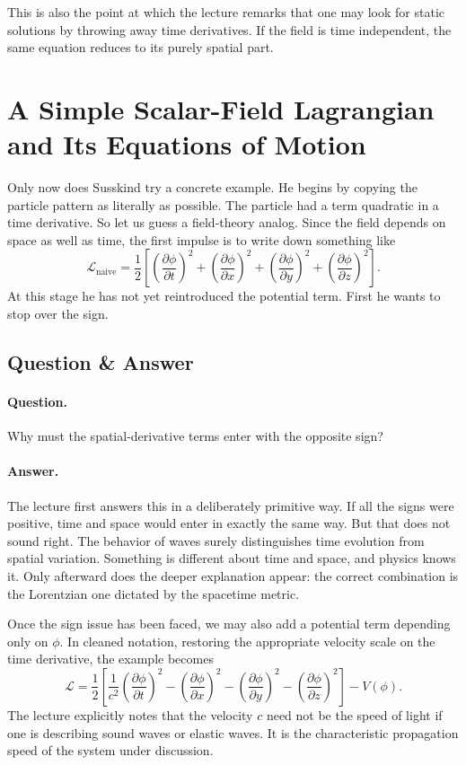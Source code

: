 This is also the point at which the lecture remarks that one may look for static solutions by throwing away time derivatives. If the field is time independent, the same equation reduces to its purely spatial part.

\section{A Simple Scalar-Field Lagrangian and Its Equations of Motion}

Only now does Susskind try a concrete example. He begins by copying the particle pattern as literally as possible. The particle had a term quadratic in a time derivative. So let us guess a field-theory analog. Since the field depends on space as well as time, the first impulse is to write down something like
\begin{equation}
\mathcal{L}_{\mathrm{naive}}
=
\frac12
\left[
\left(\frac{\partial\phi}{\partial t}\right)^2
+
\left(\frac{\partial\phi}{\partial x}\right)^2
+
\left(\frac{\partial\phi}{\partial y}\right)^2
+
\left(\frac{\partial\phi}{\partial z}\right)^2
\right].
\end{equation}
At this stage he has not yet reintroduced the potential term. First he wants to stop over the sign.

\subsection{Question \& Answer}

\paragraph{Question.} Why must the spatial-derivative terms enter with the opposite sign?

\paragraph{Answer.} The lecture first answers this in a deliberately primitive way. If all the signs were positive, time and space would enter in exactly the same way. But that does not sound right. The behavior of waves surely distinguishes time evolution from spatial variation. Something is different about time and space, and physics knows it. Only afterward does the deeper explanation appear: the correct combination is the Lorentzian one dictated by the spacetime metric.

Once the sign issue has been faced, we may also add a potential term depending only on \(\phi\). In cleaned notation, restoring the appropriate velocity scale on the time derivative, the example becomes
\begin{equation}
\mathcal{L}
=
\frac12
\left[
\frac{1}{c^2}\left(\frac{\partial\phi}{\partial t}\right)^2
-
\left(\frac{\partial\phi}{\partial x}\right)^2
-
\left(\frac{\partial\phi}{\partial y}\right)^2
-
\left(\frac{\partial\phi}{\partial z}\right)^2
\right]
-
V(\phi).
\end{equation}
The lecture explicitly notes that the velocity \(c\) need not be the speed of light if one is describing sound waves or elastic waves. It is the characteristic propagation speed of the system under discussion.

